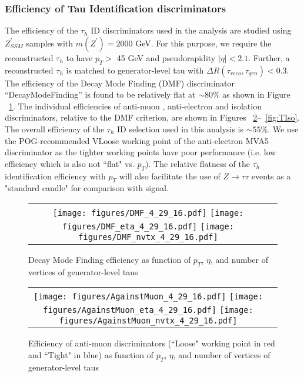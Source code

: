 \subsubsection{Efficiency of Tau Identification discriminators} \label{sec:tauIDeff}
The efficiency of the $\tau_{h}$ ID discriminators used in the analysis are studied using $Z^{\prime}_{SSM}$ samples with $m(Z^{\prime}) = 2000$ GeV. For this purpose, we require the reconstructed $\tau_{h}$ to have $p_{T} >$ 45 GeV and pseudorapidity $|\eta| < 2.1$. Further, a reconstructed $\tau_{h}$ is matched to generator-level tau with $\Delta R(\tau_{reco},\tau_{gen}) < 0.3$. The efficiency of the Decay Mode Finding (DMF) discriminator  ``DecayModeFinding'' is found to be relatively flat at $\sim 80$\% as shown in Figure ~\ref{fig:DMF}. The individual efficiencies of anti-muon , anti-electron and isolation discriminators, relative to the DMF criterion, are shown in Figures ~\ref{fig:ML3}--~\ref{fig:TIso}. The overall efficiency of the $\tau_{h}$ ID selection used in this analysis is $\sim 55$\%. We use the POG-recommended VLoose working point of the anti-electron MVA5 discriminator as the tighter working points have poor performance (i.e. low efficiency which is also not ``flat" vs. $p_{T}$). The relative flatness of the $\tau_{h}$ identification efficiency with $p_{T}$ will also facilitate the use of $Z\rightarrow\tau\tau$ events as a "standard candle" for comparison with signal. 

\begin{figure}[tbh!]
    \centering
    \begin{tabular}{cc}
      \texttt{[image: figures/DMF\_4\_29\_16.pdf]}
      \texttt{[image: figures/DMF\_eta\_4\_29\_16.pdf]}
       \texttt{[image: figures/DMF\_nvtx\_4\_29\_16.pdf]}
    \end{tabular}
    \caption{Decay Mode Finding efficiency as function of $p_{T}$, $\eta$, and number of vertices of generator-level taus }
    \label{fig:DMF}
  \end{figure}
 
\begin{figure}[tbh!]
    \centering
    \begin{tabular}{cc}
      \texttt{[image: figures/AgainstMuon\_4\_29\_16.pdf]}
      \texttt{[image: figures/AgainstMuon\_eta\_4\_29\_16.pdf]}
       \texttt{[image: figures/AgainstMuon\_nvtx\_4\_29\_16.pdf]}
    \end{tabular}
    \caption{Efficiency of anti-muon discriminators (``Loose" working point in red and ``Tight" in blue) as function of $p_{T}$, $\eta$, and number of vertices of generator-level taus }
    \label{fig:ML3}
  \end{figure}



